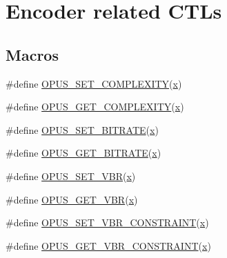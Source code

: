 \hypertarget{group__opus__encoderctls}{}\section{Encoder related C\+T\+Ls}
\label{group__opus__encoderctls}
\subsection*{Macros}
\begin{DoxyCompactItemize}
\item 
\#define \hyperlink{group__opus__encoderctls_ga3483877bf1687a75dd4a1de6f85f291c}{O\+P\+U\+S\+\_\+\+S\+E\+T\+\_\+\+C\+O\+M\+P\+L\+E\+X\+I\+TY}(\hyperlink{fmaths_8inl_a7ba8ab2f1e8f362163e17da3f15a5db9}{x})
\item 
\#define \hyperlink{group__opus__encoderctls_ga89755ee721a38d964c7630a920eb27d2}{O\+P\+U\+S\+\_\+\+G\+E\+T\+\_\+\+C\+O\+M\+P\+L\+E\+X\+I\+TY}(\hyperlink{fmaths_8inl_a7ba8ab2f1e8f362163e17da3f15a5db9}{x})
\item 
\#define \hyperlink{group__opus__encoderctls_ga0bb51947e355b33d0cb358463b5101a7}{O\+P\+U\+S\+\_\+\+S\+E\+T\+\_\+\+B\+I\+T\+R\+A\+TE}(\hyperlink{fmaths_8inl_a7ba8ab2f1e8f362163e17da3f15a5db9}{x})
\item 
\#define \hyperlink{group__opus__encoderctls_ga1427a5560cbc7e9a59f986d89c05082c}{O\+P\+U\+S\+\_\+\+G\+E\+T\+\_\+\+B\+I\+T\+R\+A\+TE}(\hyperlink{fmaths_8inl_a7ba8ab2f1e8f362163e17da3f15a5db9}{x})
\item 
\#define \hyperlink{group__opus__encoderctls_ga34d09ae06cab7e1a6c49876249b67892}{O\+P\+U\+S\+\_\+\+S\+E\+T\+\_\+\+V\+BR}(\hyperlink{fmaths_8inl_a7ba8ab2f1e8f362163e17da3f15a5db9}{x})
\item 
\#define \hyperlink{group__opus__encoderctls_ga58feba30c167962305ec268e6abe8c08}{O\+P\+U\+S\+\_\+\+G\+E\+T\+\_\+\+V\+BR}(\hyperlink{fmaths_8inl_a7ba8ab2f1e8f362163e17da3f15a5db9}{x})
\item 
\#define \hyperlink{group__opus__encoderctls_gab1b534a4fe55373f1be407ad4b2b22bd}{O\+P\+U\+S\+\_\+\+S\+E\+T\+\_\+\+V\+B\+R\+\_\+\+C\+O\+N\+S\+T\+R\+A\+I\+NT}(\hyperlink{fmaths_8inl_a7ba8ab2f1e8f362163e17da3f15a5db9}{x})
\item 
\#define \hyperlink{group__opus__encoderctls_gab35fa5691ba0dd932031b7839c47513c}{O\+P\+U\+S\+\_\+\+G\+E\+T\+\_\+\+V\+B\+R\+\_\+\+C\+O\+N\+S\+T\+R\+A\+I\+NT}(\hyperlink{fmaths_8inl_a7ba8ab2f1e8f362163e17da3f15a5db9}{x})
\item 

\end{DoxyCompactItemize}
